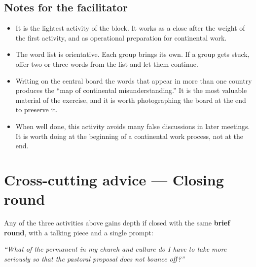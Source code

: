 \documentclass[11pt, a4paper]{article}
\begin{document}
\begin{actividad}
\subsection*{Notes for the facilitator}
\begin{itemize}
  \item It is the lightest activity of the block. It works as a close after the weight of the first activity, and as operational preparation for continental work.
  \item The word list is orientative. Each group brings its own. If a group gets stuck, offer two or three words from the list and let them continue.
  \item Writing on the central board the words that appear in more than one country produces the ``map of continental misunderstanding.'' It is the most valuable material of the exercise, and it is worth photographing the board at the end to preserve it.
  \item When well done, this activity avoids many false discussions in later meetings. It is worth doing at the beginning of a continental work process, not at the end.
\end{itemize}

\end{actividad}

\newpage

\section*{Cross-cutting advice --- Closing round}

Any of the three activities above gains depth if closed with the same \textbf{brief round}, with a talking piece and a single prompt:

\vspace{0.5em}

\begin{center}
\begin{tcolorbox}[
  enhanced, colback=territorioTierra, colframe=territorioTierra,
  boxrule=0pt, arc=3pt,
  left=18pt, right=18pt, top=16pt, bottom=16pt,
  width=0.86\linewidth,
  halign=center
]
  {\color{parch}\itshape\large ``What of the permanent in my church and culture do I have to take more seriously so that the pastoral proposal does not bounce off?''}
\end{tcolorbox}
\end{center}
\end{document}
